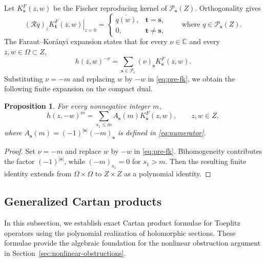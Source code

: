 \documentclass[11pt,reqno]{amsart}
\theoremstyle{corollary}
\theoremstyle{conjecture}
\theoremstyle{assumption}
\theoremstyle{proposition}
\newtheorem{proposition}[theorem]{Proposition}
\theoremstyle{remark}
\numberwithin{equation}{section}
\begin{document}
Let $K_{\mathbf s}^F(z,w)$ be the Fischer reproducing kernel of $\mathcal P_{\mathbf s}(Z)$. Orthogonality gives
\begin{equation}\label{eq:pre-fischer-contraction}
\left.(\mathcal Rq)_zK_{\mathbf t}^F(z,w)\right|_{z=0}=
\begin{cases}
\overline{q(w)},&\mathbf t=\mathbf s,\\
0,&\mathbf t\ne\mathbf s,
\end{cases}
\qquad \text{where }q\in\mathcal P_{\mathbf s}(Z).
\end{equation}
The Faraut--Kor\'anyi expansion \cite[Theorem~3.8]{FarautKoranyi1990} states that for every $\nu\in \mathbb C$ and every $z,w\in \Omega\subset Z$,
\begin{equation}\label{eq:pre-fk}
h(z,w)^{-\nu}=\sum_{\mathbf s\in\mathcal P_r}(\nu)_{\mathbf s}K_{\mathbf s}^F(z,w).
\end{equation}
Substituting $\nu=-m$ and replacing $w$ by $-w$ in \eqref{eq:pre-fk}, we obtain the following finite expansion on the compact dual.
\begin{proposition}\label{prop:pre-compact-fk}
For every nonnegative integer $m$,
\begin{equation}\label{eq:pre-compact-fk}
h(z,-w)^m=\sum_{s_1\le m}A_{\mathbf s}(m)K_{\mathbf s}^F(z,w),\qquad z,w\in Z,
\end{equation}
where $A_{\mathbf s}(m)=(-1)^{|\mathbf s|}(-m)_{\mathbf s}$ is defined in \eqref{eq:numerator}.
\end{proposition}
\begin{proof}
Set $\nu=-m$ and replace $w$ by $-w$ in \eqref{eq:pre-fk}. Bihomogeneity contributes the factor $(-1)^{|\mathbf s|}$, while $(-m)_{s_1}=0$ for $s_1>m$. Then the resulting finite identity extends from $\Omega\times\Omega$ to $Z\times Z$ as a polynomial identity.
\end{proof}

\subsection{Generalized Cartan products}
\label{subsec:pre-conical-cartan}
In this subsection, we establish exact Cartan product formulae for Toeplitz operators using the polynomial realization of holomorphic sections. These formulae provide the algebraic foundation for the nonlinear obstruction argument in Section~\ref{sec:nonlinear-obstructions}.
\end{document}
